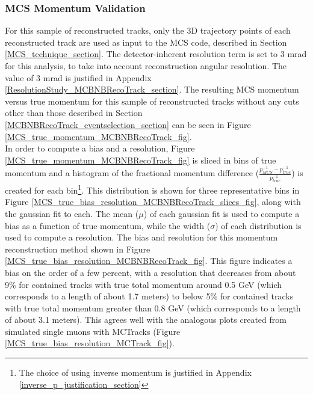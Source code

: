 \subsubsection{MCS Momentum Validation}\label{MCS_Momentum_Validation_MCBNBRecoTrack_section}
For this sample of reconstructed tracks, only the 3D trajectory points of each reconstructed track are used as input to the MCS code, described in Section \ref{MCS_technique_section}. The detector-inherent resolution term is set to 3 mrad for this analysis, to take into account reconstruction angular resolution. The value of 3 mrad is justified in Appendix \ref{ResolutionStudy_MCBNBRecoTrack_section}. The resulting MCS momentum versus true momentum for this sample of reconstructed tracks without any cuts other than those described in Section \ref{MCBNBRecoTrack_eventselection_section} can be seen in Figure \ref{MCS_true_momentum_MCBNBRecoTrack_fig}. \\

In order to compute a bias and a resolution, Figure \ref{MCS_true_momentum_MCBNBRecoTrack_fig} is sliced in bins of true momentum and a histogram of the fractional momentum difference ($\frac{p_{MCS}^{-1} - p_{true}^{-1}}{p_{true}^{-1}}$) is created for each bin\footnote{The choice of using inverse momentum is justified in Appendix \ref{inverse_p_justification_section}}. This distribution is shown for three representative bins in Figure \ref{MCS_true_bias_resolution_MCBNBRecoTrack_slices_fig}, along with the gaussian fit to each.  The mean ($\mu$) of each gaussian fit is used to compute a bias as a function of true momentum, while the width ($\sigma$) of each distribution is used to compute a resolution. The bias and resolution for this momentum reconstruction method shown in Figure \ref{MCS_true_bias_resolution_MCBNBRecoTrack_fig}. This figure indicates a bias on the order of a few percent, with a resolution that decreases from about 9\% for contained tracks with true total momentum around 0.5 GeV (which corresponds to a length of about 1.7 meters) to below 5\% for contained tracks with true total momentum greater than 0.8 GeV (which corresponds to a length of about 3.1 meters). This agrees well with the analogous plots created from simulated single muons with {\sc MCTracks} (Figure \ref{MCS_true_bias_resolution_MCTrack_fig}).


